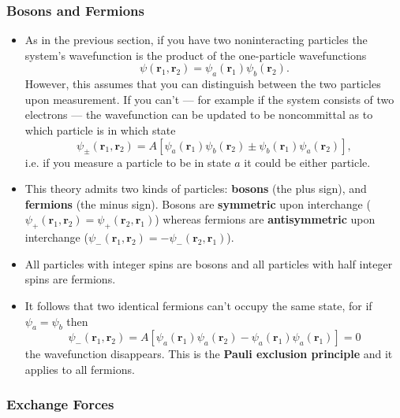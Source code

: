 \documentclass{article}
\renewcommand{\vec}[1]{\boldsymbol{\mathbf{#1}}}
\begin{document}
\subsubsection{Bosons and Fermions}

\begin{itemize}
  \item As in the previous section, if you have two noninteracting particles the system's wavefunction is the product of the one-particle wavefunctions \[\psi(\vec{r}_1, \vec{r}_2) = \psi_a(\vec{r}_1) \psi_b(\vec{r}_2).\] However, this assumes that you can distinguish between the two particles upon measurement. If you can't — for example if the system consists of two electrons — the wavefunction can be updated to be noncommittal as to which particle is in which state \[\psi_\pm(\vec{r}_1, \vec{r}_2) = A [\psi_a(\vec{r}_1) \psi_b(\vec{r}_2) \pm \psi_b(\vec{r}_1) \psi_a(\vec{r}_2)],\] i.e. if you measure a particle to be in state $a$ it could be either particle.

  \item This theory admits two kinds of particles: \textbf{bosons} (the plus sign), and \textbf{fermions} (the minus sign). Bosons are \textbf{symmetric} upon interchange ($\psi_+(\vec{r}_1, \vec{r}_2) = \psi_+(\vec{r}_2, \vec{r}_1)$) whereas fermions are \textbf{antisymmetric} upon interchange ($\psi_-(\vec{r}_1, \vec{r}_2) = -\psi_-(\vec{r}_2, \vec{r}_1)$).

  \item All particles with integer spins are bosons and all particles with half integer spins are fermions.

  \item It follows that two identical fermions can't occupy the same state, for if $\psi_a = \psi_b$ then \[\psi_-(\vec{r}_1, \vec{r}_2) = A[\psi_a (\vec{r}_1) \psi_a (\vec{r}_2) - \psi_a(\vec{r}_1) \psi_a(\vec{r}_1)] = 0\] the wavefunction disappears. This is the \textbf{Pauli exclusion principle} and it applies to all fermions.
\end{itemize}

\subsubsection{Exchange Forces}
\end{document}
